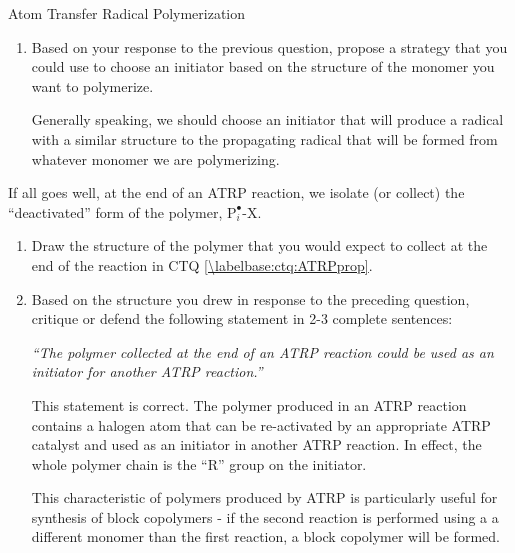 \begin{activity}{Atom Transfer Radical Polymerization}
\begin{ctqs}
\begin{enumerate}
			\item Based on your response to the previous question, propose a strategy that you could use to choose an initiator based on the structure of the monomer you want to polymerize.
	
			\begin{solution}[1.25in]
			
				Generally speaking, we should choose an initiator that will produce a radical with a similar structure to the propagating radical that will be formed from whatever monomer we are polymerizing.
			
			\end{solution}
			
		\end{enumerate}
		
	\question If all goes well, at the end of an ATRP reaction, we isolate (or collect) the ``deactivated'' form of the polymer, $\text{P}_i^\bullet\text{-X}$.
	
		\begin{enumerate}
			\item Draw the structure of the polymer that you would expect to collect at the end of the reaction in CTQ \ref{\labelbase:ctq:ATRPprop}.
				
				\begin{solution}[1.5in]
		\studentdisplay{~}
				\end{solution}
			
			\item Based on the structure you drew in response to the preceding question, critique or defend the following statement in 2-3 complete sentences:
			
				\emph{``The polymer collected at the end of an ATRP reaction could be used as an initiator for another ATRP reaction.''}
				
				\begin{solution}[2in]
				
					This statement is correct. The polymer produced in an ATRP reaction contains a halogen atom that can be re-activated by an appropriate ATRP catalyst and used as an initiator in another ATRP reaction.  In effect, the whole polymer chain is the ``R'' group on the initiator.
					
					This characteristic of polymers produced by ATRP is particularly useful for synthesis of block copolymers - if the second reaction is performed using a a different monomer than the first reaction, a block copolymer will be formed.
				

\end{solution}
\end{enumerate}
\end{ctqs}
\end{activity}
